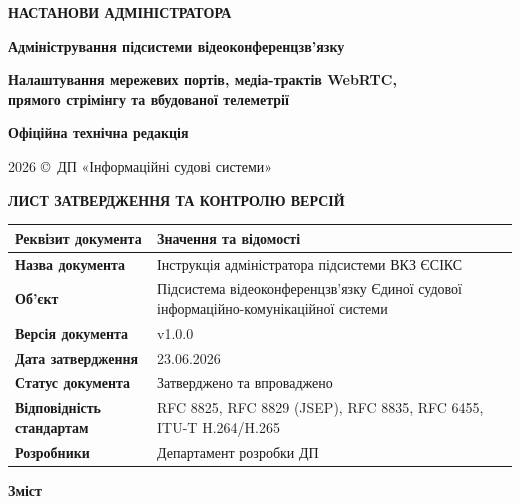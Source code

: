 \documentclass{article}
\newcommand\HUGE[1]{\fontsize{40}{40}\selectfont #1}
\begin{document}
\pagestyle{fancy}

\begin{titlepage}
  \AddToShipoutPictureBG*{\AtPageLowerLeft{\color{nato}\rule{\paperwidth}{\paperheight}}}
  \color{white}\thispagestyle{empty}\vspace*{3cm}\centering
  {\Huge  \textbf{НАСТАНОВИ АДМІНІСТРАТОРА} \par} \vspace{1.5cm}
  {\HUGE  \textbf{Адміністрування підсистеми відеоконференцзв’язку} \par} \vspace{2cm}
  {\LARGE \textbf{Налаштування мережевих портів, медіа-трактів WebRTC, \\ прямого стрімінгу та вбудованої телеметрії} \par} \vspace{1cm}
  {\large\textbf{Офіційна технічна редакція} \par}
  \vfill
  {\large 2026 \copyright\ ДП «Інформаційні судові системи» \par}
\end{titlepage}

\newpage
\thispagestyle{empty}
\begin{center}
  {\Large\color{nato}\bfseries ЛИСТ ЗАТВЕРДЖЕННЯ ТА КОНТРОЛЮ ВЕРСІЙ\par}
\end{center}
\vspace{20pt}

\begin{longtable}{@{}p{4.0cm}p{10.2cm}@{}}
\toprule
\textbf{Реквізит документа} & \textbf{Значення та відомості} \\
\midrule
\textbf{Назва документа} & Інструкція адміністратора підсистеми ВКЗ ЄСІКС \\
\textbf{Об'єкт} & Підсистема відеоконференцзв’язку Єдиної судової інформаційно-комунікаційної системи \\
\textbf{Версія документа} & v1.0.0 \\
\textbf{Дата затвердження} & 23.06.2026 \\
\textbf{Статус документа} & Затверджено та впроваджено \\
\textbf{Відповідність стандартам} & RFC 8825, RFC 8829 (JSEP), RFC 8835, RFC 6455, ITU-T H.264/H.265 \\
\textbf{Розробники} & Департамент розробки ДП \\
\bottomrule
\end{longtable}

\newpage
\begin{center}
  {\Huge\color{nato}\bfseries Зміст\par}
\end{center}
\vspace{40pt}
\tableofcontents
\end{document}
